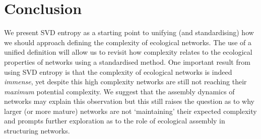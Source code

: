 \section{Conclusion}\label{conclusion}

We present SVD entropy as a starting point to unifying (and standardising) how
we should approach defining the complexity of ecological networks. The use of a
unified definition will allow us to revisit how complexity relates to the
ecological properties of networks using a standardised method. One important
result from using SVD entropy is that the complexity of ecological networks is
indeed \emph{immense}, yet despite this high complexity networks are still not
reaching their \emph{maximum} potential complexity. We suggest that the assembly
dynamics of networks may explain this observation but this still raises the
question as to why larger (or more mature) networks are not `maintaining' their
expected complexity and prompts further exploration as to the role of ecological
assembly in structuring networks.



\endinput
